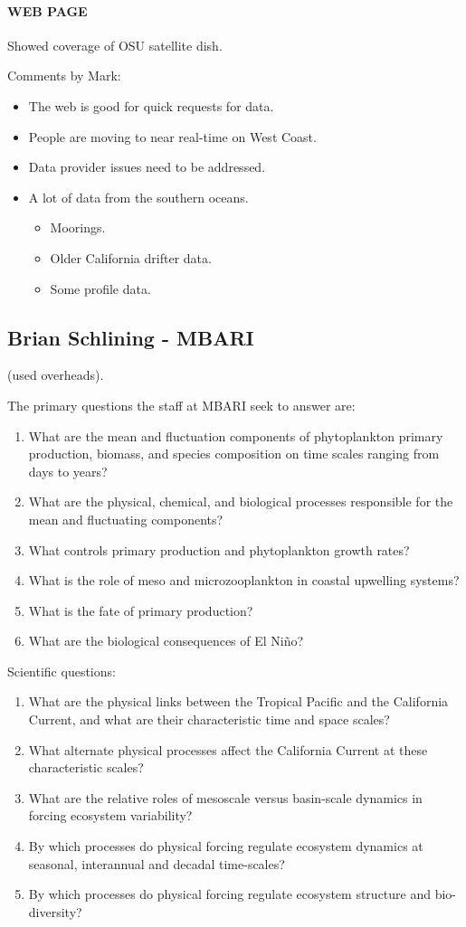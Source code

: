 \paragraph{WEB PAGE}       Showed coverage of OSU satellite dish.

Comments by Mark:
\begin{itemize}
\item The web is good for quick requests for data.
\item People are moving to near real-time on West Coast.
\item Data provider issues need to be addressed.
\item A lot of data from the southern oceans.
\begin{itemize}
\item Moorings.
\item Older California drifter data.
\item Some profile data.
\end{itemize}
\end{itemize}

\subsection{Brian Schlining - MBARI}

 (used overheads).

The primary questions the staff at MBARI seek to answer are:
\begin{enumerate}
\item What are the mean and fluctuation components of phytoplankton primary production, 
biomass, and species composition on time scales ranging from days to years?
\item What are the physical, chemical, and biological processes responsible for the mean 
and fluctuating components?
\item What controls primary production and phytoplankton growth rates?
\item What is the role of meso and microzooplankton in coastal upwelling systems?
\item What is the fate of primary production?
\item What are the biological consequences of El Ni\~no?
\end{enumerate}


Scientific questions:
\begin{enumerate}
\item What are the physical links between the Tropical Pacific and the
  California Current, and what are their characteristic time and space
  scales?
\item What alternate physical processes affect the California Current
  at these characteristic scales?
\item What are the relative roles of mesoscale versus basin-scale
  dynamics in forcing ecosystem variability?
\item By which processes do physical forcing regulate ecosystem
  dynamics at seasonal, interannual and decadal time-scales?
\item By which processes do physical forcing regulate ecosystem
  structure and bio-diversity?
\end{enumerate}


